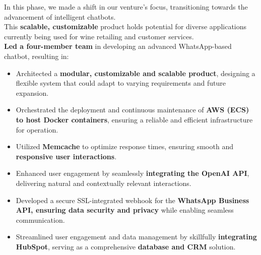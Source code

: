 

In this phase, we made a shift in our venture's focus, transitioning towards the advancement of intelligent chatbots.\\
This \textbf{scalable, customizable} product holds potential for diverse applications currently being used for wine retailing and customer services.\\
\textbf{Led a four-member team} in developing an advanced WhatsApp-based chatbot, resulting in:
\begin{itemize}
  \item Architected a \textbf{modular, customizable and scalable product}, designing a flexible system that could adapt to varying requirements and future expansion.
  \item Orchestrated the deployment and continuous maintenance of \textbf{AWS (ECS) to host Docker containers}, ensuring a reliable and efficient infrastructure for operation.
  \item Utilized \textbf{Memcache} to optimize response times, ensuring smooth and \textbf{responsive user interactions}.
  \item Enhanced user engagement by seamlessly \textbf{integrating the OpenAI API}, delivering natural and contextually relevant interactions.
  \item Developed a secure SSL-integrated webhook for the \textbf{WhatsApp Business API, ensuring data security and privacy} while enabling seamless communication.
  \item Streamlined user engagement and data management by skillfully \textbf{integrating HubSpot}, serving as a comprehensive \textbf{database and CRM} solution.
\end{itemize}


